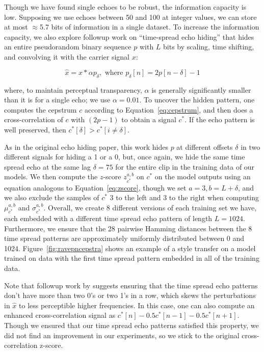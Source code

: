 \documentclass[letterpaper]{article} %
\begin{document}
Though we have found single echoes to be robust, the information capacity is low.  Supposing we use echoes between 50 and 100 at integer values, we can store at most $\approx$5.7 bits of information in a single dataset.  To increase the information capacity, we also explore followup work on ``time-spread echo hiding'' \cite{ko2005time} that hides an entire pseudorandom binary sequence $p$ with $L$ bits by scaling, time shifting, and convolving it with the carrier signal $x$:

\begin{equation}
\hat{x} = x * \alpha p_{\delta}, \text{ where } p_{\delta}[n] = 2 p[n - \delta] - 1
\end{equation}

where, to maintain perceptual transparency, $\alpha$ is generally significantly smaller than it is for a single echo; we use $\alpha = 0.01$.  To uncover the hidden pattern, one computes the cepstrum $c$ according to Equation~\ref{eq:cepstrum}, and then does a cross-correlation of $c$ with $(2p - 1)$ to obtain a signal $c^*$.  If the echo pattern is well preserved, then $c^*[\delta] > c^*[i \neq \delta]$.

As in the original echo hiding paper, this work hides $p$ at different offsets $\delta$ in two different signals for hiding a 1 or a 0, but, once again, we hide the same time spread echo at the same lag $\delta=75$ for the entire clip in the training data of our models.  We then compute the $z$-score $z_{c^*}^{a,b}$ on $c^*$ on the model outputs using an equation analogous to Equation~\ref{eq:zscore}, though we set $a = 3, b=L+\delta$, and we also exclude the samples of $c^*$ 3 to the left and 3 to the right when computing $\mu_{c^*}^{a,b}$ and $\sigma_{c^*}^{a,b}$.  Overall, we create 8 different versions of each training set we have, each embedded with a different time spread echo pattern of length $L=1024$.  Furthermore, we ensure that the 28 pairwise Hamming distances between the 8 time spread patterns are approximately uniformly distributed between 0 and 1024.  Figure~\ref{fig:ravepncepstra} shows an example of a style transfer on a model trained on data with the first time spread pattern embedded in all of the training data.


Note that followup work by \cite{xiang2010effective} suggests ensuring that the time spread echo patterns don't have more than two 0's or two 1's in a row, which skews the perturbations in $\hat{x}$ to less perceptible higher frequencies.  In this case, one can also compute an enhanced cross-correlation signal as $c^*[n] - 0.5c^*[n-1] - 0.5c^*[n+1]$.  Though we ensured that our time spread echo patterns satisfied this property, we did not find an improvement in our experiments, so we stick to the original cross-correlation z-score.
\end{document}
